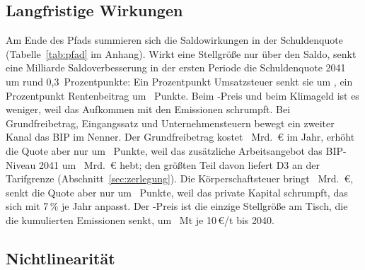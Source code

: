 \subsection{Langfristige Wirkungen}
\label{sec:pfad}

Am Ende des Pfads summieren sich die Saldowirkungen in der Schuldenquote
(Tabelle~\ref{tab:pfad} im Anhang). Wirkt eine Stellgröße nur über den Saldo,
senkt eine Milliarde Saldoverbesserung in der ersten Periode die Schuldenquote
2041 um rund 0,3~Prozentpunkte: Ein Prozentpunkt Umsatzsteuer senkt sie um
, ein Prozentpunkt Rentenbeitrag um
~Punkte. Beim \COz-Preis und beim Klimageld ist es weniger,
weil das Aufkommen mit den Emissionen schrumpft. Bei Grundfreibetrag,
Eingangssatz und Unternehmensteuern bewegt ein zweiter Kanal das BIP im Nenner.
Der Grundfreibetrag kostet ~Mrd.~\euro{}
im Jahr, erhöht die Quote aber nur um ~Punkte, weil
das zusätzliche Arbeitsangebot das BIP-Niveau 2041 um
~Mrd.~\euro{} hebt; den größten Teil davon liefert D3
an der Tarifgrenze (Abschnitt~\ref{sec:zerlegung}). Die Körperschaftsteuer bringt
~Mrd.~\euro, senkt die Quote aber nur um
~Punkte, weil das private Kapital schrumpft, das sich mit
7\,\% je Jahr anpasst. Der \COz-Preis ist die einzige Stellgröße am Tisch, die die
kumulierten Emissionen senkt, um ~Mt je 10\,\euro/t bis
2040.

\subsection{Nichtlinearität}
\label{sec:nichtlinear}


